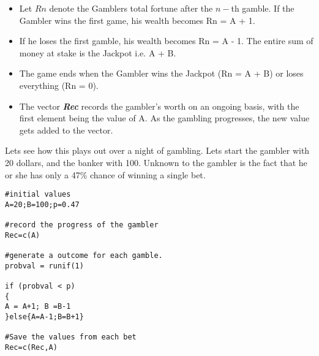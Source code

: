 \documentclass[11pt]{article} %
\begin{document}
\begin{itemize}
\item Let $Rn$ denote the Gamblers total fortune after the $n-$th gamble. If the Gambler wins the first game, his wealth becomes Rn = A + 1. 
\item If he loses the first gamble, his wealth becomes Rn = A - 1. The entire sum of money at stake is the Jackpot i.e. A + B. 
\item The game ends when the Gambler wins the Jackpot (Rn = A + B) or loses everything (Rn = 0).
\item The vector \textbf{\textit{Rec}} records the gambler's worth on an ongoing basis, with the first element being the value of A. As the gambling progresses, the new value gets added to the vector.
\end{itemize}

Lets see how this plays out over a night of gambling. Lets start the gambler with 20 dollars, and the banker with 100. Unknown to the gambler is the fact that he or she has only a 47\% chance of winning a single bet.
\begin{framed}
\begin{verbatim}
#initial values
A=20;B=100;p=0.47

#record the progress of the gambler
Rec=c(A)

#generate a outcome for each gamble.
probval = runif(1)

if (probval < p)
{
A = A+1; B =B-1
}else{A=A-1;B=B+1}

#Save the values from each bet
Rec=c(Rec,A)
\end{verbatim}
\end{framed}
\newpage
\end{document}
